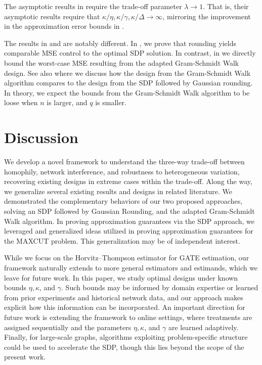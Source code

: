 \documentclass[12pt]{article}
\theoremstyle{definition}
\numberwithin{equation}{section}
\numberwithin{figure}{section}
\numberwithin{equation}{section}
\numberwithin{figure}{section}
\begin{document}
The asymptotic results in \citet{harshaw2024balancing} require the trade-off parameter $\lambda \to 1$. That is, their asymptotic results require that $\kappa/\eta, \kappa/\gamma, \kappa/\Delta \to \infty$, mirroring the improvement in the approximation error bounds in .

The results in  and  are notably different.
In , we prove that rounding yields comparable MSE control to the optimal SDP solution. In contrast, in  we directly bound the worst-case MSE resulting from the adapted Gram-Schmidt Walk design.
See also  where we discuss how the design from the Gram-Schmidt Walk algorithm compares to the design from the SDP followed by Gaussian rounding. In theory, we expect the bounds from the Gram-Schmidt Walk algorithm to be loose when $n$ is larger, and $q$ is smaller.
\section{Discussion}
We develop a novel framework to understand the three-way trade-off between homophily, network interference, and robustness to heterogeneous variation, recovering existing designs in extreme cases within the trade-off. Along the way, we generalize several existing results and designs in related literature.
We demonstrated the complementary behaviors of our two proposed approaches, solving an SDP followed by Gaussian Rounding, and the adapted Gram-Schmidt Walk algorithm. In proving approximation guarantees via the SDP approach, we leveraged and generalized ideas utilized in proving approximation guarantees for the MAXCUT problem. This generalization may be of independent interest. 

While we focus on the Horvitz–Thompson estimator for GATE estimation, our framework naturally extends to more general estimators and estimands, which we leave for future work. In this paper, we study optimal designs under known bounds $\eta, \kappa$, and $\gamma$. Such bounds may be informed by domain expertise or learned from prior experiments and historical network data, and our approach makes explicit how this information can be incorporated. An important direction for future work is extending the framework to online settings, where treatments are assigned sequentially and the parameters 
$\eta, \kappa$, and $\gamma$ are learned adaptively. Finally, for large-scale graphs,
algorithms exploiting problem-specific structure could be used to accelerate the SDP, though this lies beyond the scope of the present work.
\end{document}
